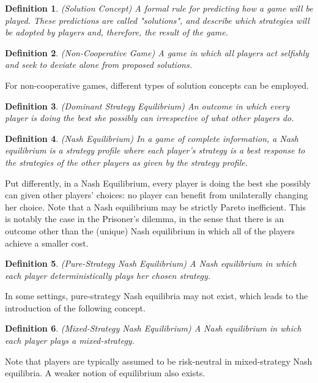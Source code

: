 \documentclass{article}
\newtheorem{definition}{Definition}
\begin{document}
\begin{definition}
(Solution Concept) A formal rule for predicting how a game will be played. These predictions are called "solutions", and describe which strategies will be adopted by players and, therefore, the result of the game.
\end{definition}

\begin{definition}
(Non-Cooperative Game) A game in which all players act selfishly and seek to deviate alone from proposed solutions.
\end{definition}

For non-cooperative games, different types of solution concepts can be employed.

\begin{definition}
(Dominant Strategy Equilibrium) An outcome in which every player is doing the best she possibly can irrespective of what other players do.
\end{definition}

\begin{definition}
(Nash Equilibrium) In a game of complete information, a Nash equilibrium is a strategy profile
where each player's strategy is a best response to the strategies of the other players as given
by the strategy profile.
\end{definition}

Put differently, in a Nash Equilibrium, every player is doing the best she possibly can given other players' choices: no player can benefit from unilaterally changing her choice. Note that a Nash equilibrium may be strictly Pareto inefficient. This is notably the case in the Prisoner's dilemma, in the sense that there is an outcome other than the (unique) Nash equilibrium in which all of the players achieve a smaller cost.

\begin{definition}
(Pure-Strategy Nash Equilibrium) A Nash equilibrium in which each player deterministically plays her chosen strategy.
\end{definition}

In some settings, pure-strategy Nash equilibria may not exist, which leads to the introduction of the following concept.

\begin{definition}
(Mixed-Strategy Nash Equilibrium) A Nash equilibrium in which each player plays a mixed-strategy.
\end{definition}

Note that players are typically assumed to be risk-neutral in mixed-strategy Nash equilibria. A weaker notion of equilibrium also exists.
\end{document}
